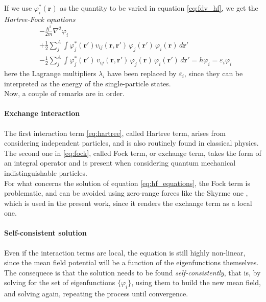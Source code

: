 If we use $\varphi_i^*(\bm r)$ as the quantity to be varied in equation \eqref{eq:fdv_hf}, we get the \textit{Hartree-Fock equations}
\begin{align}
    \label{eq:hf_equations}
    &-\frac{\hbar^2}{2m} \nabla^2 \varphi_i\\
    &+ \frac 1 2 \sum_{j}^A \int \varphi_j^* (\mathbf r') 
        v_{ij}(\mathbf r, \mathbf r')\, 
        \varphi_j (\mathbf r')\, 
        \varphi_i (\mathbf r)\, d\mathbf r'\label{eq:hartree} \\
    &- \frac 1 2 \sum_{j}^A \int \varphi_j^* (\mathbf r')\, 
        v_{ij}(\mathbf r, \mathbf r')\,
        \varphi_j (\mathbf r)\,
        \varphi_i (\mathbf r')\, d\mathbf r'\label{eq:fock}
        = h \varphi_i = \varepsilon_i \varphi_i
\end{align}
here the Lagrange multipliers $\lambda_i$ have been replaced by $\varepsilon_i$, since they can be interpreted as the energy of the single-particle states.\\
Now, a couple of remarks are in order.
\paragraph{Exchange interaction}
The first interaction term \eqref{eq:hartree}, called Hartree term, arises from considering independent particles, and is also routinely found in classical physics. The second one in \eqref{eq:fock}, called Fock term, or exchange term, takes the form of an integral operator and is present when considering quantum mechanical indistinguishable particles.
\\For what concerns the solution of equation \eqref{eq:hf_equations}, the Fock term is problematic, and can be avoided using zero-range forces like the Skyrme one \cite{SKYRME1958615}, which is used in the present work, since it renders the exchange term as a local one.
\paragraph{Self-consistent solution}
Even if the interaction terms are local, the equation is still highly non-linear, since the mean field potential will be a function of the eigenfunctions themselves. The consequece is that the solution needs to be found \textit{self-consistently}, that is, by solving for the set of eigenfunctions $\{\varphi_i\}$, using them to build the new mean field, and solving again, repeating the process until convergence.
